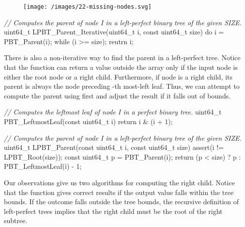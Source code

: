 \documentclass{article}
\begin{document}
\begin{figure}[grayscale-diagram]
  \texttt{[image: /images/22-missing-nodes.svg]}
\end{figure}

\begin{code}[c]
\emph{// Computes the parent of node I in a left-perfect binary tree of the given SIZE.}
uint64_t LPBT_Parent_Iterative(uint64_t i, const uint64_t size) {
    do { i = PBT_Parent(i); } while (i >= size);
    reutrn i;
}
\end{code}

There is also a non-iterative way to find the parent in a left-perfect tree.
Notice that the  function can return a value outside the array only if the input node is either the root node or a right child.
Furthermore, if node  is a right child, its parent is always the node preceding -th most-left leaf.
Thus, we can attempt to compute the parent using  first and adjust the result if it falls out of bounds.

\begin{code}[c]
\emph{// Computes the leftmost leaf of node I in a perfect binary tree.}
uint64_t PBT_LeftmostLeaf(const uint64_t i) {
    return i & (i + 1);
}

\emph{// Computes the parent of node I in a left-perfect binary tree of the given SIZE.}
uint64_t LPBT_Parent(const uint64_t i, const uint64_t size) {
    assert(i != LPBT_Root(size));
    const uint64_t p = PBT_Parent(i);
    return (p < size) ? p : PBT_LeftmostLeaf(i) - 1;
}
\end{code}

Our observations give us two algorithms for computing the right child.
Notice that the  function gives correct results if the output value falls within the tree bounds.
If the outcome falls outside the tree bounds, the recursive definition of left-perfect trees implies that the right child must be the root of the right subtree.
\end{document}

